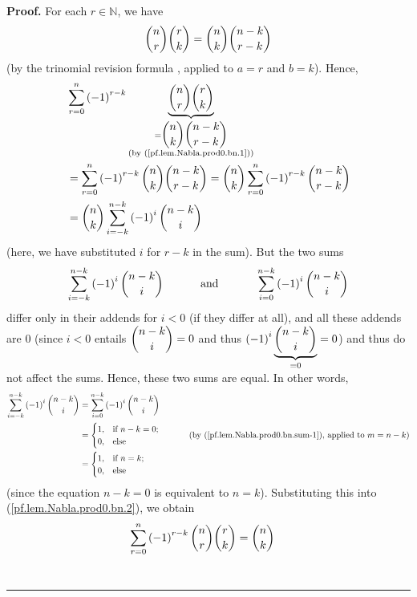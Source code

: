 \documentclass[numbers=enddot,12pt,final,onecolumn,notitlepage]{scrartcl}%
\numberwithin{exer}{subsection}
\theoremstyle{definition}
\newenvironment{proof}[1][Proof]{\noindent\textbf{#1.} }{\ \rule{0.5em}{0.5em}}
\let\sumnonlimits\sum
\renewcommand{\sum}{\sumnonlimits\limits}
\begin{document}
\begin{proof}
For each $r\in\mathbb{N}$, we have%
\begin{equation}
\dbinom{n}{r}\dbinom{r}{k}=\dbinom{n}{k}\dbinom{n-k}{r-k}
\label{pf.lem.Nabla.prod0.bn.1}%
\end{equation}
(by the trinomial revision formula \cite[Proposition 1.3.35]{19fco}, applied
to $a=r$ and $b=k$). Hence,%
\begin{align}
&  \sum_{r=0}^{n}\left(  -1\right)  ^{r-k}\underbrace{\dbinom{n}{r}\dbinom
{r}{k}}_{\substack{=\dbinom{n}{k}\dbinom{n-k}{r-k}\\\text{(by
(\ref{pf.lem.Nabla.prod0.bn.1}))}}}\nonumber\\
&  =\sum_{r=0}^{n}\left(  -1\right)  ^{r-k}\dbinom{n}{k}\dbinom{n-k}%
{r-k}=\dbinom{n}{k}\sum_{r=0}^{n}\left(  -1\right)  ^{r-k}\dbinom{n-k}%
{r-k}\nonumber\\
&  =\dbinom{n}{k}\sum_{i=-k}^{n-k}\left(  -1\right)  ^{i}\dbinom{n-k}{i}
\label{pf.lem.Nabla.prod0.bn.2}%
\end{align}
(here, we have substituted $i$ for $r-k$ in the sum). But the two sums%
\[
\sum_{i=-k}^{n-k}\left(  -1\right)  ^{i}\dbinom{n-k}{i}%
\ \ \ \ \ \ \ \ \ \ \text{and}\ \ \ \ \ \ \ \ \ \ \sum_{i=0}^{n-k}\left(
-1\right)  ^{i}\dbinom{n-k}{i}%
\]
differ only in their addends for $i<0$ (if they differ at all), and all these
addends are $0$ (since $i<0$ entails $\dbinom{n-k}{i}=0$ and thus $\left(
-1\right)  ^{i}\underbrace{\dbinom{n-k}{i}}_{=0}=0$) and thus do not affect
the sums. Hence, these two sums are equal. In other words,%
\begin{align*}
\sum_{i=-k}^{n-k}\left(  -1\right)  ^{i}\dbinom{n-k}{i}  &  =\sum_{i=0}%
^{n-k}\left(  -1\right)  ^{i}\dbinom{n-k}{i}\\
&  =%
\begin{cases}
1, & \text{if }n-k=0;\\
0, & \text{else}%
\end{cases}
\ \ \ \ \ \ \ \ \ \ \left(  \text{by (\ref{pf.lem.Nabla.prod0.bn.sum-1}),
applied to }m=n-k\right) \\
&  =%
\begin{cases}
1, & \text{if }n=k;\\
0, & \text{else}%
\end{cases}
\end{align*}
(since the equation $n-k=0$ is equivalent to $n=k$). Substituting this into
(\ref{pf.lem.Nabla.prod0.bn.2}), we obtain%
\begin{align*}
\sum_{r=0}^{n}\left(  -1\right)  ^{r-k}\dbinom{n}{r}\dbinom{r}{k}  &
=\dbinom{n}{k}%

\end{align*}
\end{proof}
\end{document}
